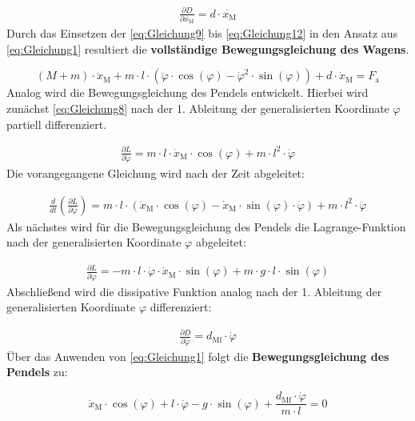 \begin{align}\label{eq:Gleichung12}
    \frac{\partial D}{\partial \dot{x_{\mathrm{M}}}} = d \cdot \dot{x_{\mathrm{M}}}
\end{align}
\newline
Durch das Einsetzen der \autoref{eq:Gleichung9} bis \autoref{eq:Gleichung12} in den Ansatz aus \autoref{eq:Gleichung1} resultiert die \textbf{vollständige Bewegungsgleichung des Wagens}.

\begin{equation}\label{eq:Gleichung13}
    \boxed{(M + m) \cdot \ddot x_{\mathrm{M}} + m \cdot l \cdot \left( \ddot \varphi \cdot \cos({\varphi}) - \dot \varphi^2 \cdot \sin({\varphi})\right) + d \cdot \dot x_{\mathrm{M}} = F_{\mathrm{a}}}
\end{equation}
\newline
Analog wird die Bewegungsgleichung des Pendels entwickelt. Hierbei wird zunächst \autoref{eq:Gleichung8} nach der 1. Ableitung der generalisierten Koordinate $\varphi$ partiell differenziert.

\begin{align}\label{eq:Gleichung14}
    \frac{\partial L}{\partial \dot{\varphi}} = m \cdot l \cdot \dot{x}_{\mathrm{M}} \cdot \cos(\varphi) + m \cdot l^2 \cdot \dot{\varphi}
\end{align}
\newline
Die vorangegangene Gleichung wird nach der Zeit abgeleitet:

\begin{align}\label{eq:Gleichung15}
    \frac{d}{dt}\left(\frac{\partial L}{\partial \dot{\varphi}}\right) = m \cdot l \cdot \left(\ddot{x}_{\mathrm{M}} \cdot  \cos(\varphi) - \dot{x}_{\mathrm{M}} \cdot \sin(\varphi) \cdot \dot{\varphi}\right) + m \cdot l^2 \cdot \ddot{\varphi}
\end{align}
\newline
Als nächstes wird für die Bewegungsgleichung des Pendels die Lagrange-Funktion nach der generalisierten Koordinate $\varphi$ abgeleitet:

\begin{align}\label{eq:Gleichung16}
    \frac{\partial L}{\partial \varphi} = -m \cdot l \cdot \dot{\varphi} \cdot \dot{x}_{\mathrm{M}} \cdot \sin(\varphi) + m \cdot g \cdot l \cdot \sin(\varphi)
\end{align}
\newline
Abschließend wird die dissipative Funktion analog nach der 1. Ableitung der generalisierten Koordinate $\varphi$ differenziert:

\begin{align}\label{eq:Gleichung17}
    \frac{\partial D}{\partial \dot{\varphi}} = d_{\mathrm{Mf}} \cdot \dot{\varphi}
\end{align}
\newline
Über das Anwenden von \autoref{eq:Gleichung1} folgt die \textbf{Bewegungsgleichung des Pendels} zu:

\begin{equation}\label{eq:Gleichung18}
    \boxed{\ddot{x}_{\mathrm{M}} \cdot \cos(\varphi) + l \cdot \ddot{\varphi} - g \cdot \sin(\varphi) + \frac{d_{\mathrm{Mf}} \cdot \dot{\varphi}}{m \cdot l} = 0}
\end{equation}